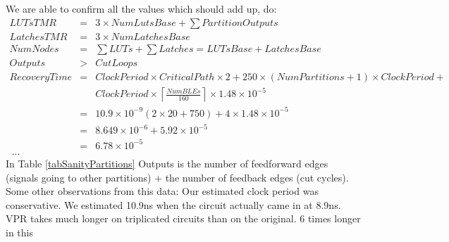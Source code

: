 \documentclass[12pt,final,oneside]{dwThesis} %
\begin{document}
   We are able to confirm all the values which should add up, do:
   \begin{eqnarray*} LUTsTMR &=& 3\times NumLutsBase + \sum PartitionOutputs\\
      LatchesTMR &=&  3\times NumLatchesBase\\ NumNodes &=& \sum LUTs+\sum
      Latches = LUTsBase+LatchesBase\\ Outputs &>& CutLoops\\ RecoveryTime &=&
      ClockPeriod\times CriticalPath\times 2 + 250\times(NumPartitions+1)\times
      ClockPeriod + \\ & &ClockPeriod\times \left\lceil
      \frac{NumBLEs}{160}\right\rceil\times 1.48\times10^{-5}\\ &=&
      10.9\times10^{-9}(2\times20+750)+4\times1.48\times10^{-5}\\ &=&
      8.649\times10^{-6}+5.92\times10^{-5}\\ &=& 6.78\times10^{-5}\\\ ...
   \end{eqnarray*} In Table \ref{tabSanityPartitions}
   Outputs is the number of feedforward edges (signals going to other
   partitions) $+$ the number of feedback edges (cut cycles).   Some other observations
   from this data: Our estimated clock period was conservative. We estimated
   10.9ns when the circuit actually came in at 8.9ns.  \gls{VPR} takes much
   longer on triplicated circuits than on the original. 6 times longer in this
\end{document}
